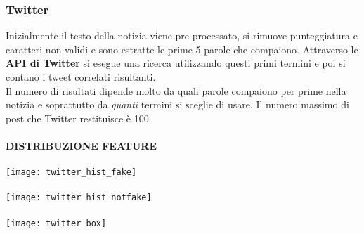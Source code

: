 \documentclass{article}
\begin{document}
\begin{multicols}{2}
				\subsubsection{Twitter}
				Inizialmente il testo della notizia viene pre-processato, si rimuove punteggiatura e caratteri non validi e sono estratte le prime 5 parole che compaiono. Attraverso le \textbf{API di Twitter} si esegue una ricerca utilizzando questi primi termini e poi si contano i tweet correlati risultanti.\\
				Il numero di risultati dipende molto da quali parole compaiono per prime nella notizia e soprattutto da \textit{quanti} termini si sceglie di usare. Il numero massimo di post che Twitter restituisce è 100.
				\\~\\
				\textbf{DISTRIBUZIONE FEATURE}	
				\\~\\
				\texttt{[image: twitter\_hist\_fake]}
				\\~\\
				\texttt{[image: twitter\_hist\_notfake]}
				\\~\\
				\texttt{[image: twitter\_box]}
				\\~\\
				

\end{multicols}
\end{document}
